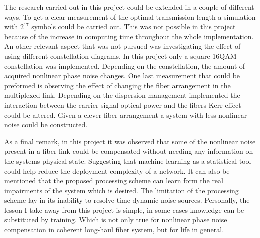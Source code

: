 The research carried out in this project could be extended in a couple of different ways. To get a clear measurement of the optimal transmission length a simulation with $2^{17}$ symbols could be carried out. This was not possible in this project because of the increase in computing time throughout the whole implementation. An other relevant aspect that was not pursued was investigating the effect of using different constellation diagrams. In this project only a square 16QAM constellation was implemented. Depending on the constellation, the amount of acquired nonlinear phase noise changes. One last measurement that could be preformed is observing the effect of changing the fiber arrangement in the multiplexed link. Depending on the dispersion management implemented the interaction between the carrier signal optical power and the fibers Kerr effect could be altered. Given a clever fiber arrangement a system with less nonlinear noise could be constructed.

As a final remark, in this project it was observed that some of the nonlinear noise present in a fiber link could be compensated without needing any information on the systems physical state. Suggesting that machine learning as a statistical tool could help reduce the deployment complexity of a network. It can also be mentioned that the proposed processing scheme can learn form the real impairments of the system which is desired. The limitation of the processing scheme lay in its inability to resolve time dynamic noise sources. Personally, the lesson I take away from this project is simple, in some cases knowledge can be substituted by training. Which is not only true for nonlinear phase noise compensation in coherent long-haul fiber system, but for life in general.    